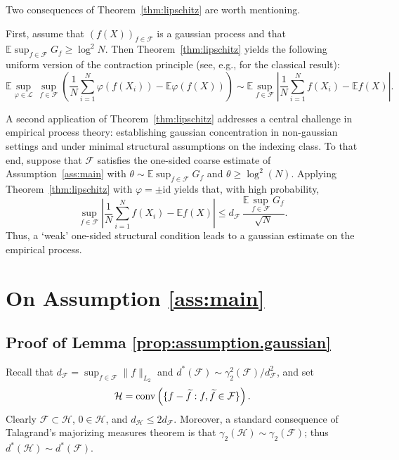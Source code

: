 \documentclass[11pt]{amsart}
\theoremstyle{definition}
\newcommand{\E}{\mathbb{E}}
\renewcommand{\tilde}{\widetilde}
\numberwithin{equation}{section}
\begin{document}
Two consequences of Theorem~\ref{thm:lipschitz} are worth mentioning.

First, assume that $(f(X))_{f\in\mathcal{F}}$ is a gaussian process and that
$\E\sup_{f\in\mathcal{F}} G_f \geq \log^2 N$.
Then Theorem~\ref{thm:lipschitz} yields the following uniform version of the contraction principle (see, e.g., \cite{ledoux1991probability} for the classical result):
\[
\E \sup_{\varphi \in \mathcal{L}}\,\sup_{f\in\mathcal{F}} 
    \left( \frac{1}{N}\sum_{i=1}^N \varphi(f(X_i)) - \E \varphi(f(X)) \right)
    \sim
 \E \sup_{f\in\mathcal{F}}
\left| \frac{1}{N}\sum_{i=1}^N f(X_i) - \E f(X) \right|.
\]

A second application of Theorem~\ref{thm:lipschitz} addresses a central challenge in empirical process theory:  establishing gaussian concentration in non-gaussian settings and under minimal structural assumptions on the indexing class.
To that end, suppose that  $\mathcal{F}$ satisfies the one-sided coarse estimate of Assumption~\ref{ass:main} with
$\theta \sim \E \sup_{f\in\mathcal{F}} G_f$ and $\theta \geq \log^2 (N)$.
Applying Theorem~\ref{thm:lipschitz} with $\varphi=\pm \mathrm{id}$ yields that, with high probability,
\[
\sup_{f\in\mathcal{F}}
\left| \frac{1}{N}\sum_{i=1}^N f(X_i) - \E f(X) \right|
\leq
d_{\mathcal{F}}\,\frac{\E\sup_{f\in\mathcal{F}} G_f}{\sqrt{N}}.
\]
Thus, a `weak' one-sided structural condition leads to a gaussian estimate on the empirical process.



\section{On Assumption \ref{ass:main}}
\label{sec:app.proof.ass}


%


\subsection{Proof of  Lemma \ref{prop:assumption.gaussian}}

	Recall that $d_{\mathcal{F}}=\sup_{f\in\mathcal{F}}\|f\|_{L_2}$ and $d^\ast(\mathcal{F})\sim \gamma_2^2(\mathcal{F}) / d_\mathcal{F}^2$, and set
	\[\mathcal{H} = {\rm conv} \left( \{f- \tilde f : f,\tilde f \in\mathcal{F}\}\right) .\]
	Clearly  $\mathcal{F}\subset \mathcal{H}$,  $0\in\mathcal{H}$, and $d_\mathcal{H}\leq 2 d_{\mathcal{F}}$.
	Moreover,  a standard consequence of Talagrand's  majorizing measures theorem is that $\gamma_{2}(\mathcal{H})\sim\gamma_{2}(\mathcal{F})$; thus $d^\ast(\mathcal{H})\sim d^\ast(\mathcal{F})$.
	
\end{document}
